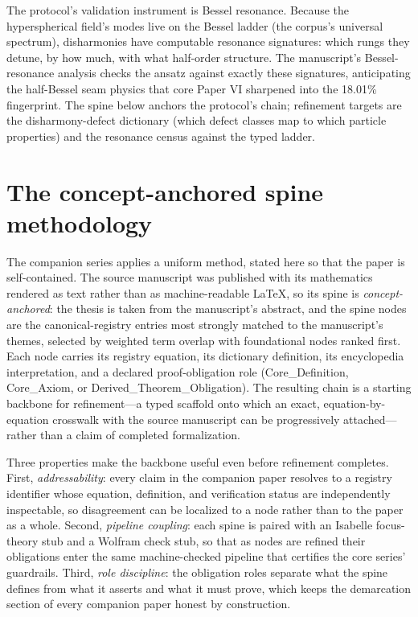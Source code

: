 \documentclass[11pt]{article}
\theoremstyle{remark}
\begin{document}
The protocol's validation instrument is Bessel resonance. Because the hyperspherical field's modes live on the Bessel ladder (the corpus's universal spectrum), disharmonies have computable resonance signatures: which rungs they detune, by how much, with what half-order structure. The manuscript's Bessel-resonance analysis checks the ansatz against exactly these signatures, anticipating the half-Bessel seam physics that core Paper VI sharpened into the 18.01\% fingerprint. The spine below anchors the protocol's chain; refinement targets are the disharmony-defect dictionary (which defect classes map to which particle properties) and the resonance census against the typed ladder.

\section{The concept-anchored spine methodology}
\label{sec:method}

The companion series applies a uniform method, stated here so that the paper is self-contained. The source manuscript was published with its mathematics rendered as text rather than as machine-readable LaTeX, so its spine is \emph{concept-anchored}: the thesis is taken from the manuscript's abstract, and the spine nodes are the canonical-registry entries most strongly matched to the manuscript's themes, selected by weighted term overlap with foundational nodes ranked first. Each node carries its registry equation, its dictionary definition, its encyclopedia interpretation, and a declared proof-obligation role (Core\_Definition, Core\_Axiom, or Derived\_Theorem\_Obligation). The resulting chain is a starting backbone for refinement---a typed scaffold onto which an exact, equation-by-equation crosswalk with the source manuscript can be progressively attached---rather than a claim of completed formalization.

Three properties make the backbone useful even before refinement completes. First, \emph{addressability}: every claim in the companion paper resolves to a registry identifier whose equation, definition, and verification status are independently inspectable, so disagreement can be localized to a node rather than to the paper as a whole. Second, \emph{pipeline coupling}: each spine is paired with an Isabelle focus-theory stub and a Wolfram check stub, so that as nodes are refined their obligations enter the same machine-checked pipeline that certifies the core series' guardrails. Third, \emph{role discipline}: the obligation roles separate what the spine defines from what it asserts and what it must prove, which keeps the demarcation section of every companion paper honest by construction.
\end{document}

